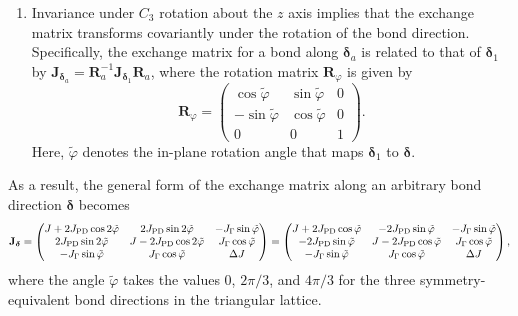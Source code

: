 \documentclass[aps, prx, nofootinbib, preprintnumbers, superscriptaddress]{revtex4-2}
\begin{document}
\begin{enumerate}[label=(\roman*)]
    
    \item Invariance under $C_3$ rotation about the $z$ axis implies that the exchange matrix transforms covariantly under the rotation of the bond direction. Specifically, the exchange matrix for a bond along $\boldsymbol\delta_{a}$ is related to that of $\boldsymbol\delta_{1}$ by $\mathbf{J}_{\boldsymbol\delta_{a}} = \mathbf{R}_{a}^{-1} \mathbf{J}_{\boldsymbol\delta_{1}} \mathbf{R}_{a}$, where the rotation matrix $\mathbf{R}_{\varphi}$ is given by
    \begin{equation}
        \mathbf{R}_{\varphi} = 
        \begin{pmatrix}
              \cos \tilde{\varphi} &  \sin \tilde{\varphi} &    0   \\
            - \sin \tilde{\varphi} &  \cos \tilde{\varphi} &    0   \\
                        0          &            0          &    1
        \end{pmatrix}.
    \end{equation}
    Here, $\tilde{\varphi}$ denotes the in-plane rotation angle that maps $\boldsymbol\delta_{1}$ to $\boldsymbol\delta$. 
\end{enumerate}
As a result, the general form of the exchange matrix along an arbitrary bond direction $\boldsymbol\delta$ becomes
\begin{equation}
    \mathbf{J}_{\boldsymbol\delta} =
    \begin{pmatrix}
        J + 2 J_{\rm PD} \cos 2\tilde{\varphi} &     2 J_{\rm PD} \sin 2\tilde{\varphi} & - J_{\Gamma} \sin \tilde{\varphi} \\
            2 J_{\rm PD} \sin 2\tilde{\varphi} & J - 2 J_{\rm PD} \cos 2\tilde{\varphi} &   J_{\Gamma} \cos \tilde{\varphi} \\
          -   J_{\Gamma} \sin  \tilde{\varphi} &       J_{\Gamma} \cos  \tilde{\varphi} &   \Delta J
    \end{pmatrix}
    =
    \begin{pmatrix}
        J + 2 J_{\rm PD} \cos \tilde{\varphi} & - 2 J_{\rm PD} \sin \tilde{\varphi}     & -J_{\Gamma} \sin \tilde{\varphi} \\
        - 2 J_{\rm PD} \sin \tilde{\varphi}   & J - 2 J_{\rm PD} \cos \tilde{\varphi}   &  J_{\Gamma} \cos \tilde{\varphi} \\
        - J_{\Gamma} \sin \tilde{\varphi}     & J_{\Gamma} \cos \tilde{\varphi}         &  \Delta J
    \end{pmatrix},
\end{equation}
where the angle $\tilde{\varphi}$ takes the values $0$, $2\pi/3$, and $4\pi/3$ for the three symmetry-equivalent bond directions in the triangular lattice.
\end{document}
